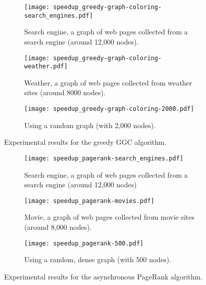 \newcommand{\figsize}[0]{6.5cm}
\captionsetup[sub]{              %
       font=scriptsize}

\begin{figure*}[htp]
   \centering
   \begin{subfigure}[b]{0.3\textwidth}
      \texttt{[image: speedup\_greedy-graph-coloring-search\_engines.pdf]}
      \caption{Search engine, a graph of web pages collected from a search engine (around 12,000 nodes).}
   \end{subfigure}
   \begin{subfigure}[b]{0.3\textwidth}
      \texttt{[image: speedup\_greedy-graph-coloring-weather.pdf]}
      \caption{Weather, a graph of web pages collected from weather sites (around 8000 nodes).\newline}
   \end{subfigure}
   \begin{subfigure}[b]{0.3\textwidth}
      \texttt{[image: speedup\_greedy-graph-coloring-2000.pdf]}
      \caption{Using a random graph (with 2,000 nodes).\newline}
   \end{subfigure}
   \caption{Experimental results for the greedy GGC algorithm.}
   \label{exp:graph_coloring}
\end{figure*}

\begin{figure*}[htp]
   \centering
   \begin{subfigure}[b]{0.3\textwidth}
      \texttt{[image: speedup\_pagerank-search\_engines.pdf]}
      \caption{Search engine, a graph of web pages collected from a search engine (around 12,000 nodes)}
   \end{subfigure}
   \begin{subfigure}[b]{0.3\textwidth}
      \texttt{[image: speedup\_pagerank-movies.pdf]}
      \caption{Movie, a graph of web pages collected from movie sites (around 8,000 nodes).\newline}
   \end{subfigure}
   \begin{subfigure}[b]{0.3\textwidth}
      \texttt{[image: speedup\_pagerank-500.pdf]}
      \caption{Using a random, dense graph (with 500 nodes).\newline}
   \end{subfigure}
   \caption{Experimental results for the asynchronous PageRank algorithm.}
   \label{exp:pagerank}
\end{figure*}

